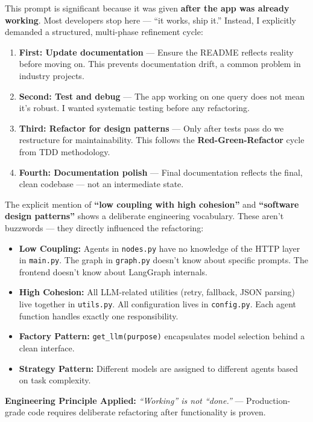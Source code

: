 \documentclass[12pt, a4paper]{article}
\begin{document}
\begin{reasonbox}
This prompt is significant because it was given \textbf{after the app was already working}. Most developers stop here — ``it works, ship it.'' Instead, I explicitly demanded a structured, multi-phase refinement cycle:

\begin{enumerate}[leftmargin=1.5em]
    \item \textbf{First: Update documentation} — Ensure the README reflects reality before moving on. This prevents documentation drift, a common problem in industry projects.
    \item \textbf{Second: Test and debug} — The app working on one query does not mean it's robust. I wanted systematic testing before any refactoring.
    \item \textbf{Third: Refactor for design patterns} — Only after tests pass do we restructure for maintainability. This follows the \textbf{Red-Green-Refactor} cycle from TDD methodology.
    \item \textbf{Fourth: Documentation polish} — Final documentation reflects the final, clean codebase — not an intermediate state.
\end{enumerate}

The explicit mention of \textbf{``low coupling with high cohesion''} and \textbf{``software design patterns''} shows a deliberate engineering vocabulary. These aren't buzzwords — they directly influenced the refactoring:

\begin{itemize}[leftmargin=1.5em]
    \item \textbf{Low Coupling:} Agents in \texttt{nodes.py} have no knowledge of the HTTP layer in \texttt{main.py}. The graph in \texttt{graph.py} doesn't know about specific prompts. The frontend doesn't know about LangGraph internals.
    \item \textbf{High Cohesion:} All LLM-related utilities (retry, fallback, JSON parsing) live together in \texttt{utils.py}. All configuration lives in \texttt{config.py}. Each agent function handles exactly one responsibility.
    \item \textbf{Factory Pattern:} \texttt{get\_llm(purpose)} encapsulates model selection behind a clean interface.
    \item \textbf{Strategy Pattern:} Different models are assigned to different agents based on task complexity.
\end{itemize}

\textbf{Engineering Principle Applied:} \textit{``Working'' is not ``done.''} — Production-grade code requires deliberate refactoring after functionality is proven.
\end{reasonbox}
\end{document}
